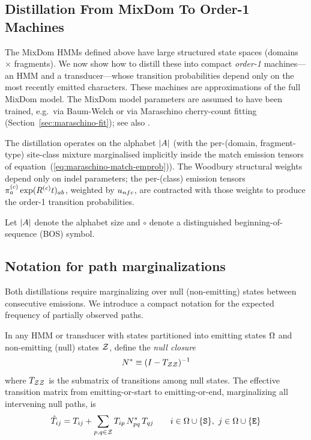 \subsection{Distillation From MixDom To Order-1 Machines}
\label{sec:distillation-levels}

The MixDom HMMs defined above have large structured state spaces
(domains $\times$ fragments).
We now show how to distill these into compact \emph{order-1} machines---an HMM and a transducer---whose
transition probabilities depend only on the most recently emitted characters.
These machines are approximations of the full MixDom model.
The MixDom model parameters are assumed to have been trained, e.g.\ via Baum-Welch or via Maraschino cherry-count fitting (Section~\ref{sec:maraschino-fit}); see also \cite{LargeHolmes2026}.

The distillation operates on the alphabet $|A|$
(with the per-(domain, fragment-type) site-class mixture marginalised
implicitly inside the match emission tensors of
equation~(\ref{eq:maraschino-match-emprob})).
The Woodbury structural weights depend only on indel parameters;
the per-(class) emission tensors
$\pi^{(c)}_a \exp(R^{(c)} t)_{ab}$,
weighted by $u_{nfc}$, are contracted with those
weights to produce the order-1 transition probabilities.

Let $|A|$ denote the alphabet size and $\circ$ denote a distinguished
beginning-of-sequence (BOS) symbol.

\subsection{Notation for path marginalizations}

Both distillations require marginalizing over null (non-emitting) states
between consecutive emissions.
We introduce a compact notation for the expected frequency of partially observed paths.

In any HMM or transducer with states partitioned into emitting states $\Omega$
and non-emitting (null) states $\mathcal{Z}$,
define the \emph{null closure}
\[
N^\ast \equiv (I - T_{\mathcal{Z}\mathcal{Z}})^{-1}
\]
where $T_{\mathcal{Z}\mathcal{Z}}$ is the submatrix of transitions among null states.
The effective transition matrix from emitting-or-start to emitting-or-end,
marginalizing all intervening null paths, is
\[
\hat{T}_{ij} = T_{ij} + \sum_{p,q \in \mathcal{Z}} T_{ip}\, N^\ast_{pq}\, T_{qj}
\qquad i \in \Omega \cup \{{\tt S}\},\  j \in \Omega \cup \{{\tt E}\}
\]

